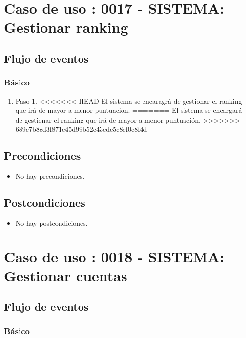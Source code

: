 \section{Caso de uso : 0017 - SISTEMA: Gestionar ranking}\label{sec:uc0}
\subsection{Flujo de eventos}
\subsubsection{Básico}

\begin{enumerate}
\item Paso 1.
<<<<<<< HEAD
El sistema se encaragrá de gestionar el ranking que irá de mayor a menor puntuación.
=======
El sistema se encargará de gestionar el ranking que irá de mayor a menor puntuación.
>>>>>>> 689c7b8cd3f871c45d99b52c43edc5c8cf0c8f4d
\end{enumerate}

\subsection{Precondiciones}
\begin{itemize}
\item No hay precondiciones.
\end{itemize}

\subsection{Postcondiciones}
\begin{itemize}
\item No hay postcondiciones.
\end{itemize}



\section{Caso de uso : 0018 - SISTEMA: Gestionar cuentas}\label{sec:uc0}
\subsection{Flujo de eventos}
\subsubsection{Básico}


